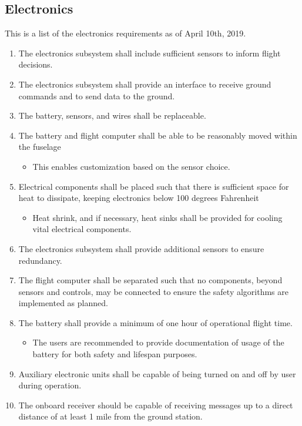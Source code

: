 \documentclass{article}
\begin{document}
\subsection{Electronics}
This is a list of the electronics requirements as of April 10th, 2019.
\begin{enumerate}
  \item{The electronics subsystem shall include sufficient sensors to inform flight decisions.}
  \item{The electronics subsystem shall provide an interface to receive ground commands and to send data to the ground.}
  \item{The battery, sensors, and wires shall be replaceable.}
  \item{The battery and flight computer shall be able to be reasonably moved within the fuselage}
  \begin{itemize}
    \item{This enables customization based on the sensor choice.}
  \end{itemize}
  \item{Electrical components shall be placed such that there is sufficient space for heat to dissipate, keeping electronics below 100 degrees Fahrenheit}
  \begin{itemize}
    \item{Heat shrink, and if necessary, heat sinks shall be provided for cooling vital electrical components.}
  \end{itemize}
  \item{The electronics subsystem shall provide additional sensors to ensure redundancy.}
  \item{The flight computer shall be separated such that no components, beyond sensors and controls, may be connected to ensure the safety algorithms are implemented as planned.}
  \item{The battery shall provide a minimum of one hour of operational flight time.}
  \begin{itemize}
    \item{The users are recommended to provide documentation of usage of the battery for both safety and lifespan purposes.}
  \end{itemize}
  \item{Auxiliary electronic units shall be capable of being turned on and off by user during operation.}
  \item{The onboard receiver should be capable of receiving messages up to a direct distance of at least 1 mile from the ground station.}

\end{enumerate}
\end{document}
